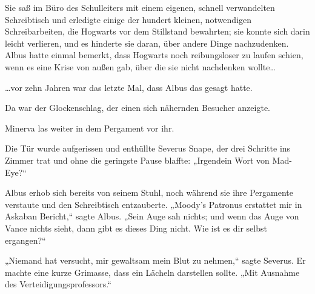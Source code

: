 Sie saß im Büro des Schulleiters mit einem eigenen, schnell verwandelten Schreibtisch und erledigte einige der hundert kleinen, notwendigen Schreibarbeiten, die Hogwarts vor dem Stillstand bewahrten; sie konnte sich darin leicht verlieren, und es hinderte sie daran, über andere Dinge nachzudenken. Albus hatte einmal bemerkt, dass Hogwarts noch reibungsloser zu laufen schien, wenn es eine Krise von außen gab, über die sie nicht nachdenken wollte…

…vor zehn Jahren war das letzte Mal, dass Albus das gesagt hatte.

Da war der Glockenschlag, der einen sich nähernden Besucher anzeigte.

Minerva las weiter in dem Pergament vor ihr.

Die Tür wurde aufgerissen und enthüllte Severus Snape, der drei Schritte ins Zimmer trat und ohne die geringste Pause blaffte: „Irgendein Wort von Mad-Eye?“

Albus erhob sich bereits von seinem Stuhl, noch während sie ihre Pergamente verstaute und den Schreibtisch entzauberte. „Moody's Patronus erstattet mir in Askaban Bericht,“ sagte Albus. „Sein Auge sah nichts; und wenn das Auge von Vance nichts sieht, dann gibt es dieses Ding nicht. Wie ist es dir selbst ergangen?“

„Niemand hat versucht, mir gewaltsam mein Blut zu nehmen,“ sagte Severus. Er machte eine kurze Grimasse, dass ein Lächeln darstellen sollte. „Mit Ausnahme des Verteidigungsprofessors.“


